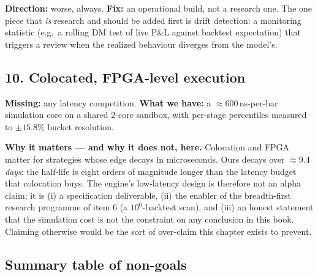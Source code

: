 \textbf{Direction:} worse, always. \textbf{Fix:} an operational build, not a research one.
The one piece that \emph{is} research and should be added first is drift detection: a
monitoring statistic (e.g.\ a rolling DM test of live P\&L against backtest expectation) that
triggers a review when the realized behaviour diverges from the model's.

\subsection{10. Colocated, FPGA-level execution}

\textbf{Missing:} any latency competition. \textbf{What we have:} a
$\approx600$\,ns-per-bar simulation core on a shared 2-core sandbox, with per-stage
percentiles measured to $\pm15.8\%$ bucket resolution.

\textbf{Why it matters --- and why it does not, here.} Colocation and FPGA matter for
strategies whose edge decays in microseconds. Ours decays over $\approx9.4$ \emph{days}: the
half-life is eight orders of magnitude longer than the latency budget that colocation buys.
The engine's low-latency design is therefore not an alpha claim; it is (i) a specification
deliverable, (ii) the enabler of the breadth-first research programme of item 6 (a
$10^6$-backtest scan), and (iii) an honest statement that the simulation cost is not the
constraint on any conclusion in this book. Claiming otherwise would be the sort of
over-claim this chapter exists to prevent.

\subsection{Summary table of non-goals}

